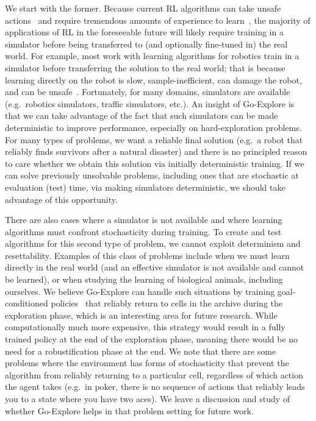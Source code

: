 \documentclass{article}
\begin{document}
We start with the former. Because current RL algorithms can take unsafe actions~\cite{mcallister2018robustness,kahn2017uncertainty} and require tremendous amounts of experience to learn~\cite{horgan:apexdqn2018,espeholt:impala2018,Lake2017BuildingMT}, the majority of applications of RL in the foreseeable future will likely require training in a simulator before being transferred to (and optionally fine-tuned in) the real world. For example, most work with learning algorithms for robotics train in a simulator before transferring the solution to the real world; that is because learning directly on the robot is slow, sample-inefficient, can damage the robot, and can be unsafe~\cite{koos2013transferability,cully:nature15,andrychowicz2018learning}. Fortunately, for many domains, simulators are available (e.g.\ robotics simulators, traffic simulators, etc.). An insight of Go-Explore is that we can take advantage of the fact that such simulators can be made deterministic to improve performance, especially on hard-exploration problems. For many types of problems, we want a reliable final solution (e.g.\ a robot that reliably finds survivors after a natural disaster) and there is no principled reason to care whether we obtain this solution via initially deterministic training. If we can solve previously unsolvable problems, including ones that are stochastic at evaluation (test) time, via making simulators deterministic, we should take advantage of this opportunity.

There are also cases where a simulator is not available and where learning algorithms must confront stochasticity during training. To create and test algorithms for this second type of problem, we cannot exploit determinism and resettability. Examples of this class of problems include when we must learn directly in the real world (and an effective simulator is not available and cannot be learned), or when studying the learning of biological animals, including ourselves. We believe Go-Explore can handle such situations by training goal-conditioned policies~\cite{andrychowicz2017hindsight,schaul2015universal} that reliably return to cells in the archive during the exploration phase, which is an interesting area for future research. While computationally much more expensive, this strategy would result in a fully trained policy at the end of the exploration phase, meaning there would be no need for a robustification phase at the end. We note that there are some problems where the environment has forms of stochasticity that prevent the algorithm from reliably returning to a particular cell, regardless of which action the agent takes (e.g.\ in poker, there is no sequence of actions that reliably leads you to a state where you have two aces). We leave a discussion and study of whether Go-Explore helps in that problem setting for future work. 
\end{document}
